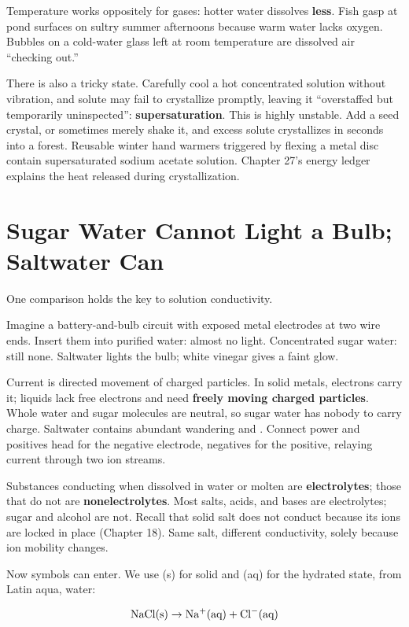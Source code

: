 Temperature works oppositely for gases: hotter water dissolves \textbf{less}. Fish gasp at pond surfaces on sultry summer afternoons because warm water lacks oxygen. Bubbles on a cold-water glass left at room temperature are dissolved air ``checking out.''

There is also a tricky state. Carefully cool a hot concentrated solution without vibration, and solute may fail to crystallize promptly, leaving it ``overstaffed but temporarily uninspected'': \textbf{supersaturation}. This is highly unstable. Add a seed crystal, or sometimes merely shake it, and excess solute crystallizes in seconds into a forest. Reusable winter hand warmers triggered by flexing a metal disc contain supersaturated sodium acetate solution. Chapter 27's energy ledger explains the heat released during crystallization.

\section{Sugar Water Cannot Light a Bulb; Saltwater Can}

One comparison holds the key to solution conductivity.

Imagine a battery-and-bulb circuit with exposed metal electrodes at two wire ends. Insert them into purified water: almost no light. Concentrated sugar water: still none. Saltwater lights the bulb; white vinegar gives a faint glow.

Current is directed movement of charged particles. In solid metals, electrons carry it; liquids lack free electrons and need \textbf{freely moving charged particles}. Whole water and sugar molecules are neutral, so sugar water has nobody to carry charge. Saltwater contains abundant wandering  and . Connect power and positives head for the negative electrode, negatives for the positive, relaying current through two ion streams.

Substances conducting when dissolved in water or molten are \textbf{electrolytes}; those that do not are \textbf{nonelectrolytes}. Most salts, acids, and bases are electrolytes; sugar and alcohol are not. Recall that solid salt does not conduct because its ions are locked in place (Chapter 18). Same salt, different conductivity, solely because ion mobility changes.

Now symbols can enter. We use (s) for solid and (aq) for the hydrated state, from Latin aqua, water:

\[\mathrm{NaCl(s)} \rightarrow \mathrm{Na^+(aq)} + \mathrm{Cl^-(aq)}\]

